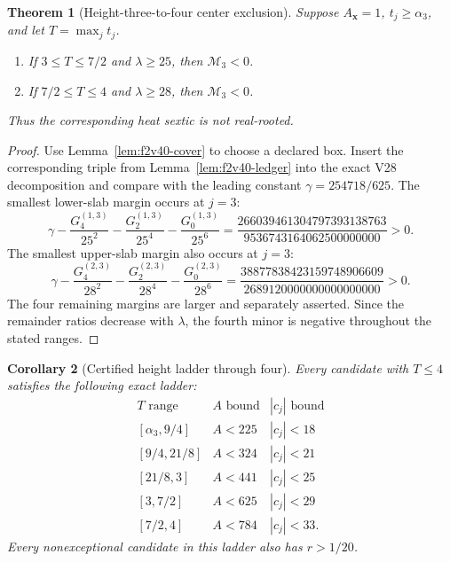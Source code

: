 \documentclass[11pt]{article}
\newtheorem{theorem}{Theorem}[section]
\newtheorem{corollary}[theorem]{Corollary}
\theoremstyle{definition}
\theoremstyle{remark}
\begin{document}
\begin{theorem}[Height-three-to-four center exclusion]
\label{thm:f2v40-center-cutoff}
Suppose \(A_{\bm x}=1\), \(t_j\geq\alpha_3\), and let
\(T=\max_jt_j\).
\begin{enumerate}[label=\textup{(\roman*)}]
\item If \(3\leq T\leq7/2\) and \(\lambda\geq25\), then
      \(\mathcal M_3<0\).
\item If \(7/2\leq T\leq4\) and \(\lambda\geq28\), then
      \(\mathcal M_3<0\).
\end{enumerate}
Thus the corresponding heat sextic is not real-rooted.
\end{theorem}

\begin{proof}
Use Lemma~\ref{lem:f2v40-cover} to choose a declared box.  Insert the
corresponding triple from Lemma~\ref{lem:f2v40-ledger} into the exact V28
decomposition and compare with the leading constant
\(\gamma=254718/625\).  The smallest lower-slab margin occurs at \(j=3\):
\[
 \gamma-\frac{G^{(1,3)}_4}{25^2}
 -\frac{G^{(1,3)}_2}{25^4}
 -\frac{G^{(1,3)}_0}{25^6}
 =\frac{266039461304797393138763}
 {9536743164062500000000}>0.
\tag{N40.8}
\]
The smallest upper-slab margin also occurs at \(j=3\):
\[
 \gamma-\frac{G^{(2,3)}_4}{28^2}
 -\frac{G^{(2,3)}_2}{28^4}
 -\frac{G^{(2,3)}_0}{28^6}
 =\frac{38877838423159748906609}
 {2689120000000000000000}>0.
\tag{N40.9}
\]
The four remaining margins are larger and separately asserted.  Since the
remainder ratios decrease with \(\lambda\), the fourth minor is negative
throughout the stated ranges.
\end{proof}

\begin{corollary}[Certified height ladder through four]
\label{cor:f2v40-height-ladder}
Every candidate with \(T\leq4\) satisfies the following exact ladder:
\[
\boxed{
\begin{array}{c|c|c}
T\text{ range}&A\text{ bound}&|c_j|\text{ bound}\\ \hline
{}[\alpha_3,9/4]&A<225&|c_j|<18\\
{}[9/4,21/8]&A<324&|c_j|<21\\
{}[21/8,3]&A<441&|c_j|<25\\
{}[3,7/2]&A<625&|c_j|<29\\
{}[7/2,4]&A<784&|c_j|<33.
\end{array}}
\tag{N40.10}
\]
Every nonexceptional candidate in this ladder also has \(r>1/20\).
\end{corollary}
\end{document}

